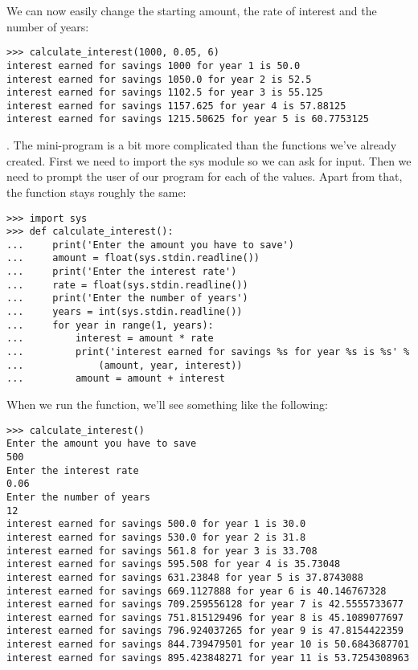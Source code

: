 \noindent
We can now easily change the starting amount, the rate of interest and the number of years:

\begin{listing}
\begin{verbatim}
>>> calculate_interest(1000, 0.05, 6)
interest earned for savings 1000 for year 1 is 50.0
interest earned for savings 1050.0 for year 2 is 52.5
interest earned for savings 1102.5 for year 3 is 55.125
interest earned for savings 1157.625 for year 4 is 57.88125
interest earned for savings 1215.50625 for year 5 is 60.7753125
\end{verbatim}
\end{listing}

. The mini-program is a bit more complicated than the functions we've already created.  First we need to import the sys module so we can ask for input.  Then we need to prompt the user of our program for each of the values.  Apart from that, the function stays roughly the same:

\begin{listing}
\begin{verbatim}
>>> import sys
>>> def calculate_interest():
...     print('Enter the amount you have to save')
...     amount = float(sys.stdin.readline())
...     print('Enter the interest rate')
...     rate = float(sys.stdin.readline())
...     print('Enter the number of years')
...     years = int(sys.stdin.readline())
...     for year in range(1, years):
...         interest = amount * rate
...         print('interest earned for savings %s for year %s is %s' % 
...             (amount, year, interest))
...         amount = amount + interest
\end{verbatim}
\end{listing}

\noindent
When we run the function, we'll see something like the following:

\begin{listingignore}
\begin{verbatim}
>>> calculate_interest()
Enter the amount you have to save
500
Enter the interest rate
0.06
Enter the number of years
12
interest earned for savings 500.0 for year 1 is 30.0
interest earned for savings 530.0 for year 2 is 31.8
interest earned for savings 561.8 for year 3 is 33.708
interest earned for savings 595.508 for year 4 is 35.73048
interest earned for savings 631.23848 for year 5 is 37.8743088
interest earned for savings 669.1127888 for year 6 is 40.146767328
interest earned for savings 709.259556128 for year 7 is 42.5555733677
interest earned for savings 751.815129496 for year 8 is 45.1089077697
interest earned for savings 796.924037265 for year 9 is 47.8154422359
interest earned for savings 844.739479501 for year 10 is 50.6843687701
interest earned for savings 895.423848271 for year 11 is 53.7254308963
\end{verbatim}
\end{listingignore}

